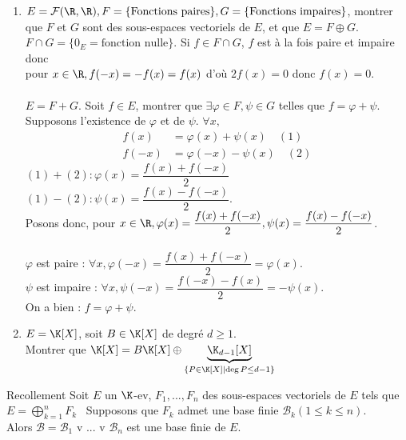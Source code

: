 \documentclass[12pt, a4paper]{report}
\begin{document}
\begin{exemple}[Exemples]
\begin{enumerate}
	\item $E = \mathcal{F}(\R,\R), F = \{ \text{Fonctions paires} \}, G = \{ \text{Fonctions impaires} \}$, montrer que $F$ et $G$ sont des sous-espaces vectoriels de $E$, et que $E = F \oplus G$. \\
	$F \cap G = \{ 0_E = \text{fonction nulle}\}$. Si $f \in F \cap G$, $f$ est à la fois paire et impaire donc \\
	pour $x \in \R, f(-x) = -f(x) = f(x)$ d'où $2 f(x) = 0$ donc $f(x)=0$. \\ \\
	$E = F+G$. Soit $f \in E$, montrer que $\exists \varphi \in F, \psi \in G$ telles que $f = \varphi + \psi$. \\
	Supposons l'existence de $\varphi$ et de $\psi$. $\forall x,$\\
	\begin{align*}
	f(x) &= \varphi(x) + \psi(x) \quad (1) \\
	f(-x) &= \varphi(-x) - \psi(x) \quad (2)
	\end{align*}
	$(1)+(2) : \varphi(x) = \dfrac{f(x)+f(-x)}{2}$ \\
	$(1)-(2) : \psi(x) = \dfrac{f(x)-f(-x)}{2}$. \\
	Posons donc, pour $x \in \R, \varphi(x) = \dfrac{f(x)+f(-x)}{2}, \psi(x) = \dfrac{f(x)-f(-x)}{2}$. \\ \\
	$\varphi$ est paire : $\forall x, \varphi(-x) = \dfrac{f(x)+f(-x)}{2} = \varphi(x)$. \\
	$\psi$ est impaire : $\forall x, \psi(-x) = \dfrac{f(-x)-f(x)}{2} = -\psi(x)$. \\
	On a bien : $f = \varphi + \psi$. \\
	
	\item $E = \K[X]$, soit $B \in \K[X]$ de degré $d \ge 1$. \\
	Montrer que $\K[X] = B \K[X] \oplus \underbrace{\K_{d-1}[X]}_{\{P \in \K[X] \mid \deg P \le d-1 \}}$
\end{enumerate}
\end{exemple}

\begin{theoreme}{Recollement}{}
Soit $E$ un $\K$-ev, $F_1,...,F_n$ des sous-espaces vectoriels de $E$ tels que $E=\displaystyle{\bigoplus_{k=1}^n F_k}$ \
Supposons que $F_k$ admet une base finie $\mathcal{B}_k (1 \le k \le n)$. \\
Alors $\mathcal{B} = \mathcal{B}_1 \text{ v } ... \text{ v } \mathcal{B}_n$ est une base finie de $E$.
\end{theoreme}
\end{document}
